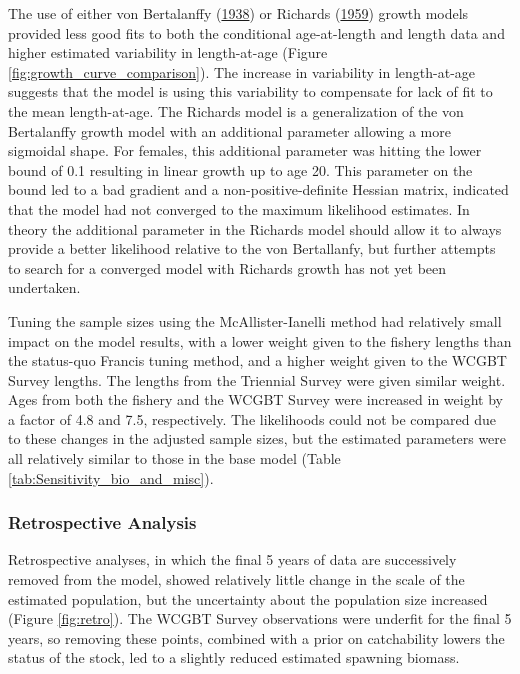 \documentclass[12pt,]{article}
\begin{document}
The use of either von Bertalanffy (\protect\hyperlink{ref-VonB}{1938})
or Richards (\protect\hyperlink{ref-richards1959flexible}{1959}) growth
models provided less good fits to both the conditional age-at-length and
length data and higher estimated variability in length-at-age (Figure
\ref{fig:growth_curve_comparison}). The increase in variability in
length-at-age suggests that the model is using this variability to
compensate for lack of fit to the mean length-at-age. The Richards model
is a generalization of the von Bertalanffy growth model with an
additional parameter allowing a more sigmoidal shape. For females, this
additional parameter was hitting the lower bound of 0.1 resulting in
linear growth up to age 20. This parameter on the bound led to a bad
gradient and a non-positive-definite Hessian matrix, indicated that the
model had not converged to the maximum likelihood estimates. In theory
the additional parameter in the Richards model should allow it to always
provide a better likelihood relative to the von Bertallanfy, but further
attempts to search for a converged model with Richards growth has not
yet been undertaken.

Tuning the sample sizes using the McAllister-Ianelli method had
relatively small impact on the model results, with a lower weight given
to the fishery lengths than the status-quo Francis tuning method, and a
higher weight given to the WCGBT Survey lengths. The lengths from the
Triennial Survey were given similar weight. Ages from both the fishery
and the WCGBT Survey were increased in weight by a factor of 4.8 and
7.5, respectively. The likelihoods could not be compared due to these
changes in the adjusted sample sizes, but the estimated parameters were
all relatively similar to those in the base model (Table
\ref{tab:Sensitivity_bio_and_misc}).

\hypertarget{retrospective-analysis}{%
\subsubsection{Retrospective Analysis}\label{retrospective-analysis}}

Retrospective analyses, in which the final 5 years of data are
successively removed from the model, showed relatively little change in
the scale of the estimated population, but the uncertainty about the
population size increased (Figure \ref{fig:retro}). The WCGBT Survey
observations were underfit for the final 5 years, so removing these
points, combined with a prior on catchability lowers the status of the
stock, led to a slightly reduced estimated spawning biomass.
\end{document}
